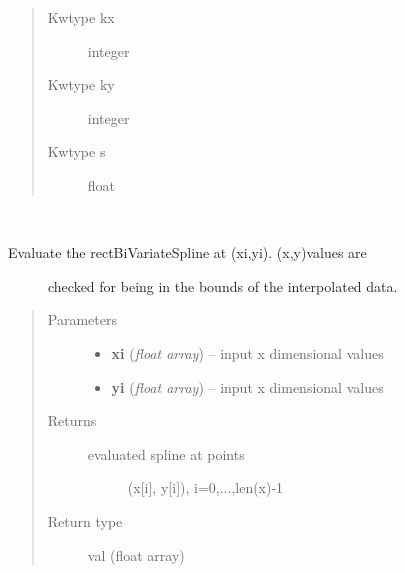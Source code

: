 \documentclass[letterpaper,10pt,english]{sphinxmanual}
\begin{document}
\begin{fulllineitems}
\begin{quote}
\begin{description}
\item[{Kwtype kx}] \leavevmode
integer

\item[{Kwtype ky}] \leavevmode
integer

\item[{Kwtype s}] \leavevmode
float

\end{description}\end{quote}

\begin{fulllineitems}
\label{eqtools:eqtools.trispline.RectBivariateSpline.ev}~\begin{description}
\item[{Evaluate the rectBiVariateSpline at (xi,yi).  (x,y)values are}] \leavevmode
checked for being in the bounds of the interpolated data.

\end{description}
\begin{quote}\begin{description}
\item[{Parameters}] \leavevmode\begin{itemize}
\item {} 
\textbf{xi} (\emph{float array}) -- input x dimensional values

\item {} 
\textbf{yi} (\emph{float array}) -- input x dimensional values

\end{itemize}

\item[{Returns}] \leavevmode
\begin{description}
\item[{evaluated spline at points}] \leavevmode
(x{[}i{]}, y{[}i{]}), i=0,...,len(x)-1

\end{description}


\item[{Return type}] \leavevmode
val (float array)

\end{description}\end{quote}

\end{fulllineitems}


\end{fulllineitems}
\end{document}
